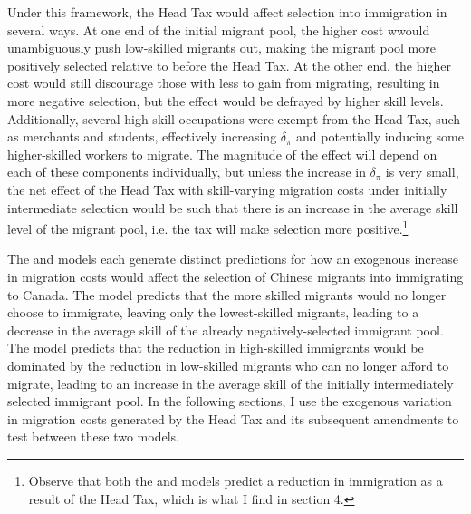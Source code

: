 Under this framework, the Head Tax would affect selection into immigration in several ways. At one end of the initial migrant pool, the higher cost wwould unambiguously push low-skilled migrants out, making the migrant pool more positively selected relative to before the Head Tax. At the other end, the higher cost would still discourage those with less to gain from migrating, resulting in more negative selection, but the effect would be defrayed by higher skill levels. Additionally, several high-skill occupations were exempt from the Head Tax, such as merchants and students, effectively increasing $\delta_{\pi}$ and potentially inducing some higher-skilled workers to migrate. 
The magnitude of the effect will depend on each of these components individually, but unless the increase in $\delta_{\pi}$ is very small, the net effect of the Head Tax with skill-varying migration costs under initially intermediate selection would be such that there is an increase in the average skill level of the migrant pool, i.e. the tax will make selection more positive.\footnote{Observe that both the \citet{borjas1987} and \citet{chiquiarhanson2005} models predict a reduction in immigration as a result of the Head Tax, which is what I find in section 4.}

The \citet{borjas1987} and \citet{chiquiarhanson2005} models each generate distinct predictions for how an exogenous increase in migration costs would affect the selection of Chinese migrants into immigrating to Canada. The \citet{borjas1987} model predicts that the more skilled migrants would no longer choose to immigrate, leaving only the lowest-skilled migrants, leading to a decrease in the average skill of the already negatively-selected immigrant pool. The \citet{chiquiarhanson2005} model predicts that the reduction in high-skilled immigrants would be dominated by the reduction in low-skilled migrants who can no longer afford to migrate, leading to an increase in the average skill of the initially intermediately selected immigrant pool. In the following sections, I use the exogenous variation in migration costs generated by the Head Tax and its subsequent amendments to test between these two models.

